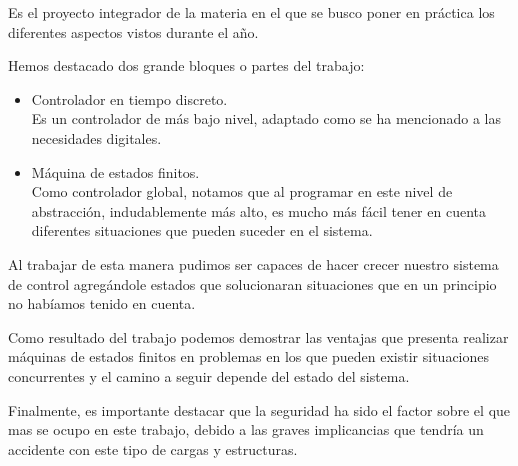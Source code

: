 \documentclass[journal]{IEEEtran}
\begin{document}
Es el proyecto integrador de la materia en el que se busco poner en práctica los diferentes
aspectos vistos durante el año.

Hemos destacado dos grande bloques o partes del trabajo:

\begin{itemize}

\item Controlador en tiempo discreto.\\
Es un controlador de más bajo nivel, adaptado como se ha mencionado a las necesidades
digitales.

\item Máquina de estados finitos.\\
Como controlador global, notamos que al programar en este nivel de abstracción, indudablemente
más alto, es mucho más fácil tener en cuenta diferentes situaciones que pueden suceder
en el sistema. 

\end{itemize}

Al trabajar de esta manera pudimos ser capaces de hacer crecer nuestro sistema
de control agregándole estados que solucionaran situaciones 
que en un principio no habíamos tenido en cuenta.

Como resultado del trabajo podemos demostrar las ventajas que presenta realizar máquinas
de estados finitos en problemas en los que pueden existir situaciones concurrentes y
el camino a seguir depende del estado del sistema.

Finalmente, es importante destacar que la seguridad ha sido el factor sobre el que mas 
se ocupo en este trabajo, debido a las graves implicancias que tendría un accidente con este 
tipo de cargas y estructuras.






%
\end{document}
